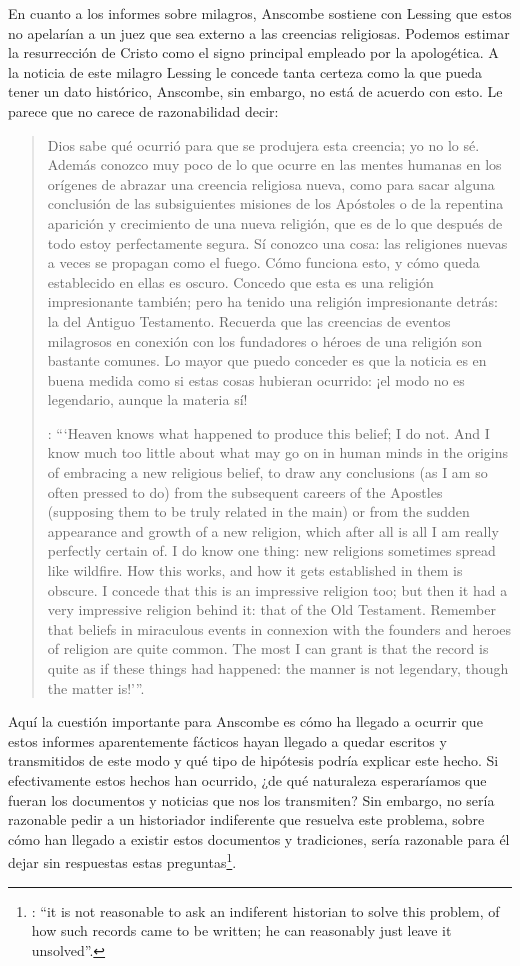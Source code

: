 En cuanto a los informes sobre milagros, Anscombe sostiene con Lessing que estos no apelarían a un juez que sea externo a las creencias religiosas. Podemos estimar la resurrección de Cristo como el signo principal empleado por la apologética. A la noticia de este milagro Lessing le concede tanta certeza como la que pueda tener un dato histórico, Anscombe, sin embargo, no está de acuerdo con esto. Le parece que no carece de razonabilidad decir: \blockquote[{\Cite[26]{anscombe2008faith:prophandmi}}: \enquote{`Heaven knows what happened to produce this belief; I do not. And I know much too little about what may go on in human minds in the origins of embracing a new religious belief, to draw any conclusions (as I am so often pressed to do) from the subsequent careers of the Apostles (supposing them to be truly related in the main) or from the sudden appearance and growth of a new religion, which after all is all I am really perfectly certain of. I do know one thing: new religions sometimes spread like wildfire. How this works, and how it gets established in them is obscure. I concede that this is an impressive religion too; but then it had a very impressive religion behind it: that of the Old Testament. Remember that beliefs in miraculous events in connexion with the founders and heroes of religion are quite common. The most I can grant is that the record is quite as if these things had happened: the manner is not legendary, though the matter is!'}.]{Dios sabe qué ocurrió para que se produjera esta creencia; yo no lo sé. Además conozco muy poco de lo que ocurre en las mentes humanas en los orígenes de abrazar una creencia religiosa nueva, como para sacar alguna conclusión \textelp{} de las subsiguientes misiones de los Apóstoles \textelp{} o de la repentina aparición y crecimiento de una nueva religión, que es de lo que después de todo estoy perfectamente segura. Sí conozco una cosa: las religiones nuevas a veces se propagan como el fuego. Cómo funciona esto, y cómo queda establecido en ellas es oscuro. Concedo que esta es una religión impresionante también; pero ha tenido una religión impresionante detrás: la del Antiguo Testamento. Recuerda que las creencias de eventos milagrosos en conexión con los fundadores o héroes de una religión son bastante comunes. Lo mayor que puedo conceder es que la noticia es en buena medida como si estas cosas hubieran ocurrido: ¡el modo no es legendario, aunque la materia sí!}

Aquí la cuestión importante para Anscombe es cómo ha llegado a ocurrir que estos informes aparentemente fácticos hayan llegado a quedar escritos y transmitidos de este modo y qué tipo de hipótesis podría explicar este hecho. Si efectivamente estos hechos han ocurrido, ¿de qué naturaleza esperaríamos que fueran los documentos y noticias que nos los transmiten? Sin embargo, no sería razonable pedir a un historiador indiferente que resuelva este problema, sobre cómo han llegado a existir estos documentos y tradiciones, sería razonable para él dejar sin respuestas estas preguntas\footnote{\cite[Cf.][37]{anscombe2008faith:prophandmi}: \enquote{it is not reasonable to ask an indiferent historian to solve this problem, of how such records came to be written; he can reasonably just leave it unsolved}.}.

